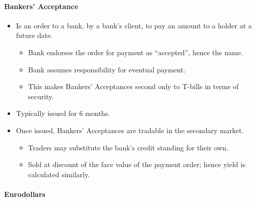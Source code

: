 \documentclass[notoc,notitlepage]{tufte-book}
\begin{document}
\paragraph{Bankers' Acceptance}\label{para:bankers_acceptance}

\begin{itemize}
  \item Is an order to a bank, by a bank's client, to pay an amount to a holder
    at a future date.
    \begin{itemize}
      \item Bank endorses the order for payment as ``accepted'', hence the name.
      \item Bank assumes responsibility for eventual payment.
      \item This makes Bankers' Acceptances second only to T-bills
        in terms of security.
    \end{itemize}
  \item Typically issued for 6 months.
  \item Once issued, Bankers' Acceptances are tradable in the secondary market.
    \begin{itemize}
      \item Traders may substitute the bank's credit standing for their own.
      \item Sold at discount of the face value of the payment order; hence
        yield is calculated similarly.
    \end{itemize}
\end{itemize}

\paragraph{Eurodollars}\label{para:eurodollars}
\end{document}

